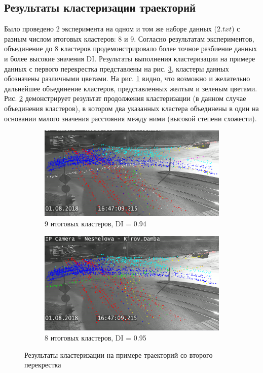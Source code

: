 \subsection{Результаты кластеризации траекторий}

Было проведено 2 эксперимента на одном и том же наборе данных ($2.txt$) с разным числом итоговых кластеров: 8 и 9. Согласно результатам экспериментов, объединение до 8 кластеров продемонстрировало более точное разбиение данных и более высокие значения DI. Результаты выполнения кластеризации на примере данных с первого перекрестка представлены на рис. \ref{fig:clust-res}, кластеры данных обозначены различными цветами. На рис. \ref{fig:9cl-di-94} видно, что возможно и желательно дальнейшее объединение кластеров, представленных желтым и зеленым цветами. Рис. \ref{fig:8cl-di-95} демонстрирует результат продолжения кластеризации (в данном случае объединения кластеров), в котором два указанных кластера объединены в один на основании малого значения расстояния между ними (высокой степени схожести).

\begin{figure}[!htb]
	\centering
	\begin{subfigure}[!htb]{0.8\textwidth}
		\centering{}
		\includegraphics[width=\textwidth]{images/9cl-di-94.png}
		\caption{9 итоговых кластеров, DI = 0.94}
		\label{fig:9cl-di-94}
	\end{subfigure}
	\hfill
	\begin{subfigure}[!htb]{0.8\textwidth}
		\centering{}
		\includegraphics[width=\textwidth]{images/8cl-di-95.png}
		\caption{8 итоговых кластеров, DI = 0.95}
		\label{fig:8cl-di-95}
	\end{subfigure}
	\caption{Результаты кластеризации на примере траекторий со второго перекрестка}
	\label{fig:clust-res}
\end{figure}

